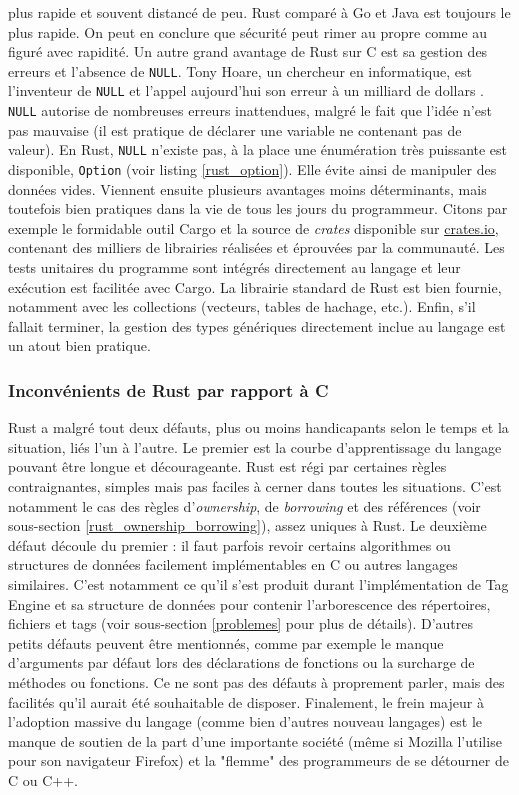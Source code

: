 plus rapide et souvent distancé de peu. Rust comparé à Go et Java est toujours le plus rapide. 
On peut en conclure que sécurité peut rimer au propre comme au figuré avec rapidité.
\bigbreak
Un autre grand avantage de Rust sur C est sa gestion des erreurs et l'absence de \texttt{NULL}. 
Tony Hoare, un chercheur en informatique, est l'inventeur de \texttt{NULL} et l'appel 
aujourd'hui son erreur à un milliard de dollars \cite{ref52}. \texttt{NULL} autorise de 
nombreuses erreurs inattendues, malgré le fait que l'idée n'est pas mauvaise (il est pratique de 
déclarer une variable ne contenant pas de valeur). En Rust, \texttt{NULL} n'existe pas, à la 
place une énumération très puissante est disponible, \texttt{Option} (voir listing \ref{rust_option}).
Elle évite ainsi de manipuler des données vides.
\bigbreak
Viennent ensuite plusieurs avantages moins déterminants, mais toutefois bien pratiques dans la 
vie de tous les jours du programmeur. Citons par exemple le formidable outil Cargo et la source 
de \textit{crates} disponible sur \href{crates.io}{crates.io}, contenant des milliers de librairies 
réalisées et éprouvées par la communauté. Les tests unitaires du programme sont intégrés directement 
au langage et leur exécution est facilitée avec Cargo. La librairie standard de Rust est bien fournie,
notamment avec les collections (vecteurs, tables de hachage, etc.). Enfin, s'il fallait terminer, 
la gestion des types génériques directement inclue au langage est un atout bien pratique.

\subsubsection{Inconvénients de Rust par rapport à C}
Rust a malgré tout deux défauts, plus ou moins handicapants selon le temps et la situation, liés 
l'un à l'autre. Le premier est la courbe d'apprentissage du langage pouvant être longue et décourageante. 
Rust est régi par certaines règles contraignantes, simples mais pas faciles à cerner dans toutes 
les situations. C'est notamment le cas des règles d'\textit{ownership}, de \textit{borrowing} et 
des références (voir sous-section \ref{rust_ownership_borrowing}), assez uniques à Rust. 
Le deuxième défaut découle du premier : il faut parfois revoir certains algorithmes ou structures 
de données facilement implémentables en C ou autres langages similaires. C'est notamment ce qu'il 
s'est produit durant l'implémentation de Tag Engine et sa structure de données pour contenir 
l'arborescence des répertoires, fichiers et tags (voir sous-section \ref{problemes} pour plus de détails).
D'autres petits défauts peuvent être mentionnés, comme par exemple le manque d'arguments par défaut 
lors des déclarations de fonctions ou la surcharge de méthodes ou fonctions. Ce ne sont pas des 
défauts à proprement parler, mais des facilités qu'il aurait été souhaitable de disposer. 
Finalement, le frein majeur à l'adoption massive du langage (comme bien d'autres nouveau langages) 
est le manque de soutien de la part d'une importante société (même si Mozilla l'utilise pour 
son navigateur Firefox) et la "flemme" des programmeurs de se détourner de C ou C++.

